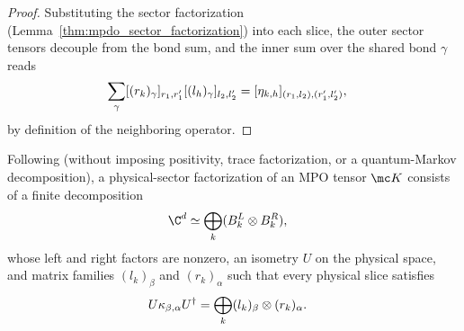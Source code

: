 \begin{proof}
    \leanok
    Substituting the sector factorization
    (Lemma~\ref{thm:mpdo_sector_factorization}) into each slice, the
    outer sector tensors decouple from the bond sum, and the inner sum over
    the shared bond $\gamma$ reads
    \begin{align}
        \sum_{\gamma}
        [(r_k)_{\gamma}]_{r_1,r_1'}
        [(l_h)_{\gamma}]_{l_2,l_2'}
         & =
        [\eta_{k,h}]_{(r_1,l_2),(r_1',l_2')},
        \notag
    \end{align}
    by definition of the neighboring operator.
\end{proof}

\begin{definition}
    \label{def:mpdo_physical_sector_factorization}
    \leanok
    Following \cite[Appendix~C.2, lines~1381--1388]{Cirac2016MPDO_arXiv}
    (without imposing positivity, trace factorization, or a quantum-Markov
    decomposition), a physical-sector factorization of an MPO tensor $\mc K$
    consists of a finite decomposition
    \begin{align}
        \C^d
         & \simeq\bigoplus_k(B_k^L\otimes B_k^R),
        \notag
    \end{align}
    whose left and right factors are nonzero,
    an isometry $U$ on the physical space, and matrix families
    $(l_k)_\beta$ and $(r_k)_\alpha$ such that every physical slice satisfies
    \begin{align}
        U\kappa_{\beta,\alpha}U^\dagger
         & =\bigoplus_k(l_k)_\beta\otimes(r_k)_\alpha.
        \notag
    \end{align}
\end{definition}

